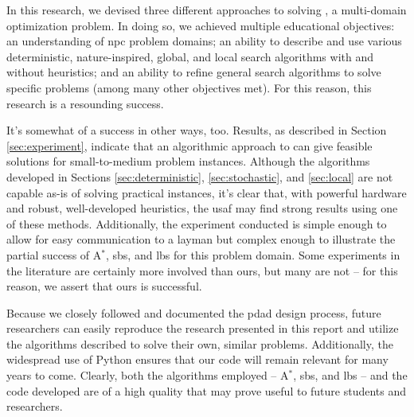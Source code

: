 \documentclass[../main.tex]{subfiles}
\begin{document}
In this research, we devised three different approaches to solving \prob, a multi-domain optimization problem. In doing so, we achieved multiple educational objectives: an understanding of \ac{npc} problem domains; an ability to describe and use various deterministic, nature-inspired, global, and local search algorithms with and without heuristics; and an ability to refine general search algorithms to solve specific problems (among many other objectives met). For this reason, this research is a resounding success.

It's somewhat of a success in other ways, too. Results, as described in Section \ref{sec:experiment}, indicate that an algorithmic approach to \probs can give feasible solutions for small-to-medium problem instances. Although the algorithms developed in Sections \ref{sec:deterministic}, \ref{sec:stochastic}, and \ref{sec:local} are not capable as-is of solving practical \probs instances, it's clear that, with powerful hardware and robust, well-developed heuristics, the \ac{usaf} may find strong results using one of these methods. Additionally, the experiment conducted is simple enough to allow for easy communication to a layman but complex enough to illustrate the partial success of A$^*$, \ac{sbs}, and \ac{lbs} for this problem domain. Some experiments in the literature are certainly more involved than ours, but many are not -- for this reason, we assert that ours is successful.

Because we closely followed and documented the \ac{pdad} design process, future researchers can easily reproduce the research presented in this report and utilize the algorithms described to solve their own, similar problems. Additionally, the widespread use of Python ensures that our code will remain relevant for many years to come. Clearly, both the algorithms employed -- A$^*$, \ac{sbs}, and \ac{lbs} -- and the code developed are of a high quality that may prove useful to future students and researchers.
\end{document}
